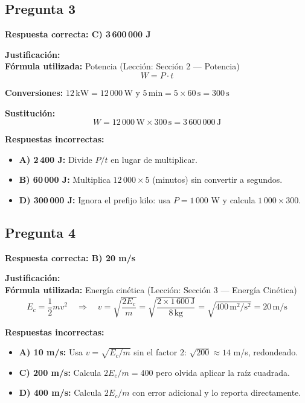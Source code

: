 \begin{respuestabox}
\subsection{Pregunta 3}
\textcolor{verdecorrecto}{\textbf{Respuesta correcta: C) 3\,600\,000 J}}

\textbf{Justificación:}\\
\textbf{Fórmula utilizada:} Potencia (Lección: Sección 2 --- Potencia)
$$W = P \cdot t$$

\textbf{Conversiones:} $12\,\text{kW} = 12\,000\,\text{W}$ \quad y \quad $5\,\text{min} = 5 \times 60\,\text{s} = 300\,\text{s}$

\textbf{Sustitución:}
$$W = 12\,000\,\text{W} \times 300\,\text{s} = 3\,600\,000\,\text{J}$$

\textbf{Respuestas incorrectas:}
\begin{itemize}
    \item \textbf{A) 2\,400 J:} Divide $P/t$ en lugar de multiplicar.
    \item \textbf{B) 60\,000 J:} Multiplica $12\,000 \times 5$ (minutos) sin convertir a segundos.
    \item \textbf{D) 300\,000 J:} Ignora el prefijo kilo: usa $P = 1\,000$ W y calcula $1\,000 \times 300$.
\end{itemize}
\end{respuestabox}

\begin{respuestabox}
\subsection{Pregunta 4}
\textcolor{verdecorrecto}{\textbf{Respuesta correcta: B) 20 m/s}}

\textbf{Justificación:}\\
\textbf{Fórmula utilizada:} Energía cinética (Lección: Sección 3 --- Energía Cinética)
$$E_c = \frac{1}{2}mv^2 \quad \Rightarrow \quad v = \sqrt{\frac{2E_c}{m}} = \sqrt{\frac{2 \times 1\,600\,\text{J}}{8\,\text{kg}}} = \sqrt{400\,\text{m}^2/\text{s}^2} = 20\,\text{m/s}$$

\textbf{Respuestas incorrectas:}
\begin{itemize}
    \item \textbf{A) 10 m/s:} Usa $v = \sqrt{E_c/m}$ sin el factor 2: $\sqrt{200} \approx 14$ m/s, redondeado.
    \item \textbf{C) 200 m/s:} Calcula $2E_c/m = 400$ pero olvida aplicar la raíz cuadrada.
    \item \textbf{D) 400 m/s:} Calcula $2E_c/m$ con error adicional y lo reporta directamente.
\end{itemize}
\end{respuestabox}

